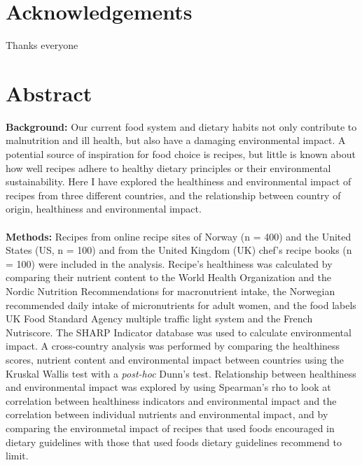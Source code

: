 \let\maketitle\oldmaketitle

\pagestyle{plain}

\chapter*{Acknowledgements}
Thanks everyone
\pagebreak

\chapter*{Abstract}
\textbf{Background:} Our current food system and dietary habits not only contribute to malnutrition and ill health, but also have a damaging environmental impact. A potential source of inspiration for food choice is recipes, but little is known about how well recipes adhere to healthy dietary principles or their environmental sustainability. Here I have explored the healthiness and environmental impact of recipes from three different countries, and the relationship between country of origin, healthiness and environmental impact.\\\\
\textbf{Methods:} Recipes from online recipe sites of Norway (n = 400) and the United States (US, n = 100) and from the United Kingdom (UK) chef's recipe books (n = 100) were included in the analysis. Recipe's healthiness was calculated by comparing their nutrient content to the World Health Organization and the Nordic Nutrition Recommendations for macronutrient intake, the Norwegian recommended daily intake of micronutrients for adult women, and the food labels UK Food Standard Agency multiple traffic light system and the French Nutriscore. The SHARP Indicator database was used to calculate environmental impact. A cross-country analysis was performed by comparing the healthiness scores, nutrient content and environmental impact between countries using the Kruskal Wallis test with a \emph{post-hoc} Dunn's test. Relationship between healthiness and environmental impact was explored by using Spearman's rho to look at correlation between healthiness indicators and environmental impact and the correlation between individual nutrients and environmental impact, and by comparing the environmetal impact of recipes that used foods encouraged in dietary guidelines with those that used foods dietary guidelines recommend to limit.\\\\\\
